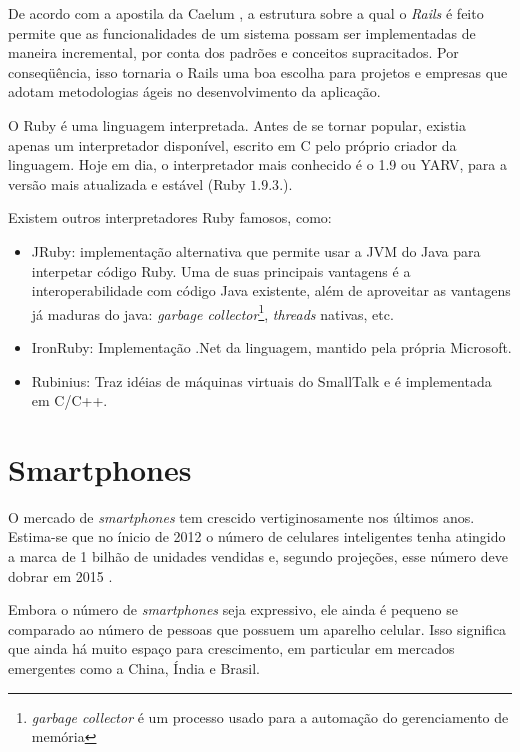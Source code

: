  	De acordo com a apostila da Caelum \cite{caelum}, a estrutura sobre a qual o \emph{Rails} é feito permite que as funcionalidades de um sistema possam ser implementadas de maneira incremental, por conta dos padrões e conceitos supracitados. Por conseqüência, isso tornaria o Rails uma boa escolha para projetos e empresas que adotam metodologias ágeis no desenvolvimento da aplicação.

 	O Ruby é uma linguagem interpretada. Antes de se tornar popular, existia apenas um interpretador disponível, escrito em C pelo próprio criador da linguagem. Hoje em dia, o interpretador mais conhecido é o 1.9 ou \ac{YARV}, para a versão mais atualizada e estável (Ruby $1.9.3$.).
 	
	Existem outros interpretadores Ruby famosos, como:
 \begin{itemize}
 \item JRuby: implementação alternativa que permite usar a \ac{JVM} do Java para interpetar código Ruby. Uma de suas principais vantagens é a interoperabilidade com código Java existente, além de aproveitar as vantagens já maduras do java: \emph{garbage collector}\footnote{\emph{garbage collector} é um processo usado para a automação do gerenciamento de memória}, \emph{threads} nativas, etc.
 \item IronRuby: Implementação .Net da linguagem, mantido pela própria Microsoft.
 \item Rubinius: Traz idéias de máquinas virtuais do SmallTalk e é implementada em C/C++.
 \end{itemize}
 \section{Smartphones}

 	O mercado de \emph{smartphones} tem crescido vertiginosamente nos últimos anos. Estima-se que no ínicio de 2012 o número de celulares inteligentes tenha atingido a marca de 1 bilhão de unidades vendidas e, segundo projeções, esse número deve dobrar em 2015 \cite{yahoosmart}. 
 	
	Embora o número de \emph{smartphones} seja expressivo, ele ainda é pequeno se comparado ao número de pessoas que possuem um aparelho celular. Isso significa que ainda há muito espaço para crescimento, em particular em mercados emergentes como a China, Índia e Brasil.
 	
